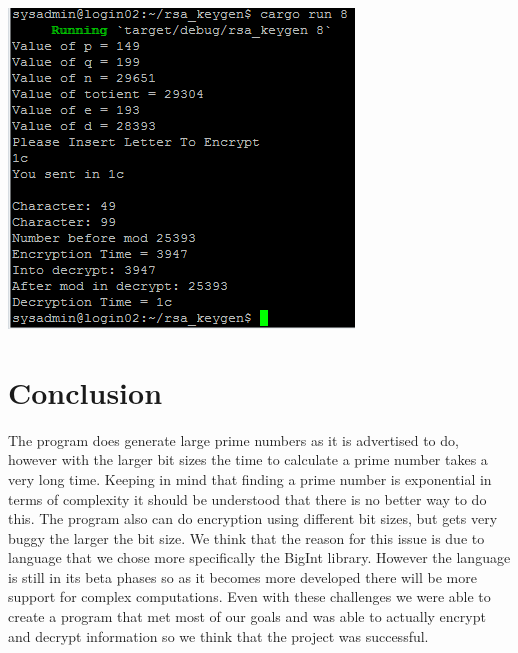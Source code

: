 \documentclass[12pt,technote]{IEEEtran}
\begin{document}
\includegraphics[scale=0.6]{Capture.PNG}


\section{Conclusion}
The program does generate large prime numbers as it is advertised to do, however 
with the larger bit sizes the time to calculate a prime number takes a very long 
time. Keeping in mind that finding a prime number is exponential in terms of 
complexity it should be understood that there is no better way to do this. The 
program also can do encryption using different bit sizes, but gets very buggy 
the larger the bit size. We think that the reason for this issue is due to 
language that we chose more specifically the BigInt library. However the 
language is still in its beta phases so as it becomes more developed there will 
be more support for complex computations. Even with these challenges we were 
able to create a program that met most of our goals and was able to actually 
encrypt and decrypt information so we think that the project was successful.
\cite{sos}


\end{document}
